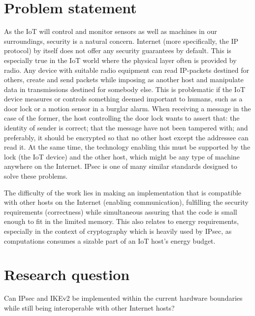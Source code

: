 \documentclass[final,a4paper,twoside,11pt,onecolumn]{report}
\begin{document}
\section{Problem statement}
As the IoT will control and monitor sensors as well as machines in our surroundings, security is a natural concern. Internet (more specifically, the IP protocol) by itself does not offer any security guarantees by default. This is especially true in the IoT world where the physical layer often is provided by radio. Any device with suitable radio equipment can read IP-packets destined for others, create and send packets while imposing as another host and manipulate data in transmissions destined for somebody else. This is problematic if the IoT device measures or controls something deemed important to humans, such as a door lock or a motion sensor in a burglar alarm. When receiving a message in the case of the former, the host controlling the door lock wants to assert that: the identity of sender is correct; that the message have not been tampered with; and preferably, it should be encrypted so that no other host except the addressee can read it. At the same time, the technology enabling this must be supported by the lock (the IoT device) and the other host, which might be any type of machine anywhere on the Internet. IPsec is one of many similar standards designed to solve these problems.

The difficulty of the work lies in making an implementation that is compatible with other hosts on the Internet (enabling communication), fulfilling the security requirements (correctness) while simultaneous assuring that the code is small enough to fit in the limited memory. This also relates to energy requirements, especially in the context of cryptography which is heavily used by IPsec, as computations consumes a sizable part of an IoT host's energy budget.

\section{Research question}
Can IPsec and IKEv2 be implemented within the current hardware boundaries while still being interoperable with other Internet hosts?
 
\end{document}
